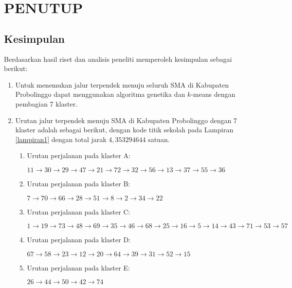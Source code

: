 \chapter{PENUTUP}

\section{Kesimpulan}

Berdasarkan hasil riset dan analisis peneliti memperoleh kesimpulan sebagai berikut:

\begin{enumerate}
\item Untuk menemukan jalur terpendek menuju seluruh SMA di Kabupaten Probolinggo dapat menggunakan algoritma genetika dan $k$-means dengan pembagian 7 klaster.
\item Urutan jalur terpendek menuju SMA di Kabupaten Probolinggo dengan 7 klaster adalah sebagai berikut, dengan kode titik sekolah pada Lampiran \ref{lampiran1} dengan total jarak $4,353294644$ satuan.

\begin{enumerate}

\item Urutan perjalanan pada klaster A:

$11\rightarrow30\rightarrow29\rightarrow47\rightarrow21\rightarrow72\rightarrow32\rightarrow56\rightarrow13\rightarrow37\rightarrow55\rightarrow36$

\item Urutan perjalanan pada klaster B:

$7\rightarrow70\rightarrow66\rightarrow28\rightarrow51\rightarrow8\rightarrow2\rightarrow34\rightarrow22$

\item Urutan perjalanan pada klaster C:

$1\rightarrow19\rightarrow73\rightarrow48\rightarrow69\rightarrow35\rightarrow46\rightarrow68\rightarrow25\rightarrow16\rightarrow5\rightarrow14\rightarrow43\rightarrow71\rightarrow53\rightarrow57$

\item Urutan perjalanan pada klaster D:

$67\rightarrow58\rightarrow23\rightarrow12\rightarrow20\rightarrow64\rightarrow39\rightarrow31\rightarrow52\rightarrow15$

\item Urutan perjalanan pada klaster E:

$26\rightarrow44\rightarrow50\rightarrow42\rightarrow74$


\end{enumerate}
\end{enumerate}
